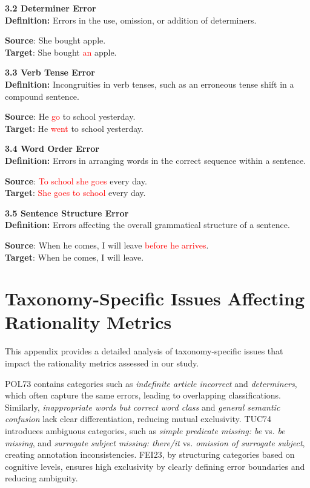 \begin{tcolorbox}[breakable]
\noindent \textbf{3.2 Determiner Error}\\
\textbf{Definition:} Errors in the use, omission, or addition of determiners.


\textbf{Source}: She bought apple. \\
\textbf{Target}: She bought \textcolor{red}{an} apple.


\noindent \textbf{3.3 Verb Tense Error}\\
\textbf{Definition:} Incongruities in verb tenses, such as an erroneous tense shift in a compound sentence.


\textbf{Source}: He \textcolor{red}{go} to school yesterday. \\
\textbf{Target}: He \textcolor{red}{went} to school yesterday.


\noindent \textbf{3.4 Word Order Error}\\
\textbf{Definition:} Errors in arranging words in the correct sequence within a sentence.


\textbf{Source}: \textcolor{red}{To school she goes} every day. \\
\textbf{Target}: \textcolor{red}{She goes to school} every day.


\noindent \textbf{3.5 Sentence Structure Error}\\
\textbf{Definition:} Errors affecting the overall grammatical structure of a sentence.


\textbf{Source}: When he comes, I will leave \textcolor{red}{before he arrives}. \\
\textbf{Target}: When he comes, I will leave.

\end{tcolorbox}



\section{Taxonomy-Specific Issues Affecting Rationality Metrics}  
\label{appendix main}  
This appendix provides a detailed analysis of taxonomy-specific issues that impact the rationality metrics assessed in our study.  

POL73 contains categories such as \textit{indefinite article incorrect} and \textit{determiners}, which often capture the same errors, leading to overlapping classifications. Similarly, \textit{inappropriate words but correct word class} and \textit{general semantic confusion} lack clear differentiation, reducing mutual exclusivity. TUC74 introduces ambiguous categories, such as \textit{simple predicate missing: be} vs. \textit{be missing}, and \textit{surrogate subject missing: there/it} vs. \textit{omission of surrogate subject}, creating annotation inconsistencies. FEI23, by structuring categories based on cognitive levels, ensures high exclusivity by clearly defining error boundaries and reducing ambiguity.  

